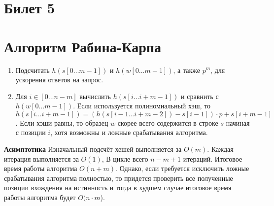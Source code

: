 \section{Билет 5}
\section*{Алгоритм Рабина-Карпа}
\begin{enumerate}
    \item Подсчитать $h(s[0 \ldots m-1])$ и $h(w[0 \ldots m-1])$, а также $p^m$, для ускорения ответов на запрос.
    \item Для $i \in [0 \ldots n-m]$ вычислить $h(s[i \ldots i+m-1])$ и сравнить с $h(w[0 \ldots m-1])$. Если используется полиномиальный хэш, то $h(s[i \ldots i+m-1]) = (h(s[i-1 \ldots i+m-2]) - s[i-1]) \cdot p + s[i+m-1]$. Если хэши равны, то образец $w$ скорее всего содержится в строке $s$ начиная с позиции $i$, хотя возможны и ложные срабатывания алгоритма.
\end{enumerate}
\textbf{Асимптотика}
\newline
Изначальный подсчёт хешей выполняется за $O(m)$. Каждая итерация выполняется за $O(1)$, В цикле всего $n-m+1$ итераций. Итоговое время работы алгоритма $O(n+m)$. Однако, если требуется исключить ложные срабатывания алгоритма полностью, то придется проверить все полученные позиции вхождения на истинность и тогда в худшем случае итоговое время работы алгоритма будет $O(n \cdot m$).